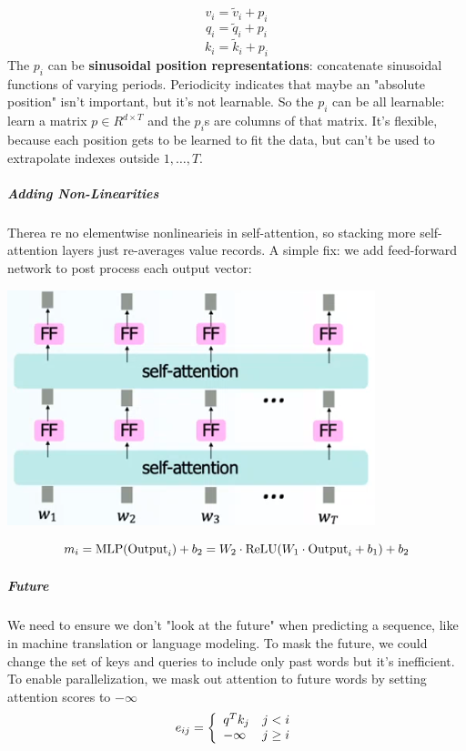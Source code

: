 \documentclass[10pt]{report}
\begin{document}
$$v_i = \tilde{v}_i+p_i$$
$$q_i = \tilde{q}_i+p_i$$
$$k_i = \tilde{k}_i+p_i$$
The $p_i$ can be \textbf{sinusoidal position representations}: concatenate sinusoidal functions of varying periods. Periodicity indicates that maybe an "absolute position" isn't important, but it's not learnable. So the $p_i$ can be all learnable: learn a matrix $p\in R^{d\times T}$ and the $p_i$s are columns of that matrix. It's flexible, because each position gets to be learned to fit the data, but can't be used to extrapolate indexes outside $1,\ldots,T$.
\subparagraph{Adding Non-Linearities} Therea re no elementwise nonlinearieis in self-attention, so stacking more self-attention layers just re-averages value records. A simple fix: we add feed-forward network to post process each output vector:
\begin{center}
	\includegraphics[scale=0.5]{69.png}
\end{center}
$$m_i = \hbox{MLP}(\hbox{Output}_i) + b_2 = W_2\cdot\hbox{ReLU}(W_1\cdot\hbox{Output}_i + b_1)+b_2$$
\subparagraph{Future} We need to ensure we don't "look at the future" when predicting a sequence, like in machine translation or language modeling. To mask the future, we could change the set of keys and queries to include only past words but it's inefficient. To enable parallelization, we mask out attention to future words by setting attention scores to $-\infty$
$$e_{ij}=\left\{\begin{array}{l l}
q^Tk_j&j<i\\
-\infty&j\geq i
\end{array}\right.$$
\end{document}
